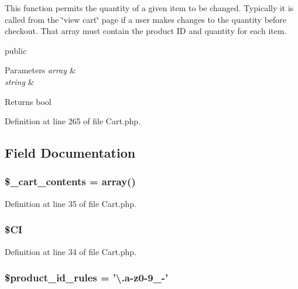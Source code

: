 This function permits the quantity of a given item to be changed. Typically it is called from the \char`\"{}view cart\char`\"{} page if a user makes changes to the quantity before checkout. That array must contain the product I\-D and quantity for each item.

public 
\begin{DoxyParams}{Parameters}
{\em array} & \\
\hline
{\em string} & \\
\hline
\end{DoxyParams}
\begin{DoxyReturn}{Returns}
bool 
\end{DoxyReturn}


Definition at line 265 of file Cart.\-php.



\subsection{Field Documentation}
\hypertarget{class_c_i___cart_a93aff4174af6004d8cc7a51bf0c59632}{
\subsubsection[{\$\-\_\-cart\-\_\-contents}]{\setlength{\rightskip}{0pt plus 5cm}\$\-\_\-cart\-\_\-contents = array()}}\label{class_c_i___cart_a93aff4174af6004d8cc7a51bf0c59632}


Definition at line 35 of file Cart.\-php.

\hypertarget{class_c_i___cart_ae0314d046ddf7fcfaec03222977427d3}{
\subsubsection[{\$\-C\-I}]{\setlength{\rightskip}{0pt plus 5cm}\$C\-I}}\label{class_c_i___cart_ae0314d046ddf7fcfaec03222977427d3}


Definition at line 34 of file Cart.\-php.

\hypertarget{class_c_i___cart_aef9fb0bb2a9ab37008d77ed80b7b122b}{
\subsubsection[{\$product\-\_\-id\-\_\-rules}]{\setlength{\rightskip}{0pt plus 5cm}\$product\-\_\-id\-\_\-rules = '\textbackslash{}.{\bf a}-\/z0-\/9\-\_\--\/'}}\label{class_c_i___cart_aef9fb0bb2a9ab37008d77ed80b7b122b}


